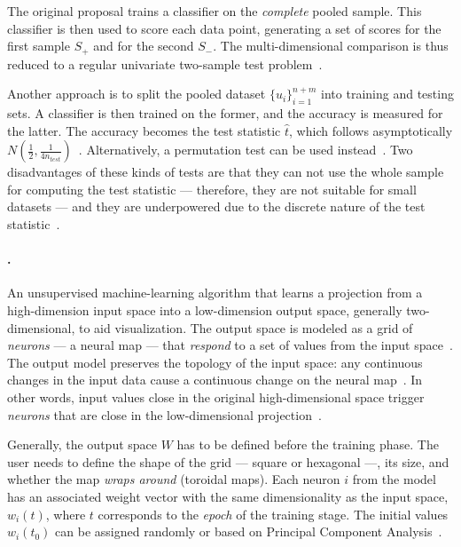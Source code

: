 The original proposal trains a classifier on the \emph{complete} pooled sample.
This classifier is then used to score each data point, generating a set of scores
for the first sample $S_+$ and for the second $S_-$. The multi-dimensional comparison
is thus reduced to a regular univariate two-sample test problem~\cite{friedman2004multivariate}.

Another approach is to split the pooled dataset $\{u_i\}_{i=1}^{n+m}$ into training
and testing sets. A classifier is then trained on the former, and the accuracy is
measured for the latter. The accuracy becomes the test statistic $\hat t$, which
follows asymptotically $N(\frac{1}{2}, \frac{1}{4 n_{test}})$~\cite{lopez2016revisiting}.
Alternatively, a permutation test can be used  instead~\cite{kim2021classification}.
Two disadvantages of these kinds of tests are that they can not use the whole sample
for computing the test statistic --- therefore, they are not suitable for small
datasets --- and they are underpowered due to the discrete nature of the test
statistic~\cite{rosenblatt2021better}.

\paragraph{.}
An unsupervised machine-learning algorithm that learns
a projection from a high-dimension input space into a low-dimension output space,
generally two-dimensional, to aid visualization.
The output space is modeled as a grid of \emph{neurons} --- a neural map ---
that \emph{respond} to a set of values from the input space~\cite{kohonen1982self}.
The output model preserves the topology of the input space: any continuous changes
in the input data cause a continuous change on the neural map~\cite{Villmann1999}.
In other words, input values close in the original high-dimensional space
trigger \emph{neurons} that are close in the low-dimensional projection~\cite{KOHONEN201352}.

Generally, the output space $W$ has to be defined before the training phase.
The user needs to define the shape of the grid --- square or hexagonal ---,
its size, and whether the map \emph{wraps around} (toroidal maps).
Each neuron $i$ from the model has an associated weight vector with the same
dimensionality as the input space, $w_{i}(t)$, where $t$ corresponds to the
\emph{epoch} of the training stage.
The initial values $w_i(t_0)$ can be assigned randomly or based on
Principal Component Analysis~\cite{KOHONEN201352}.

